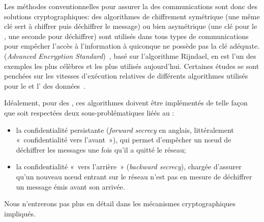 Les méthodes conventionnelles pour assurer la  des communications sont donc des solutions cryptographiques: des algorithmes de chiffrement symétrique (une même clé sert à chiffrer puis déchiffrer le message) ou bien asymétrique (une clé pour le , une seconde pour déchiffrer) sont utilisés dans tous types de communications pour empêcher l'accès à l'information à quiconque ne possède pas la clé adéquate.
 (\textit{Advanced Encryption Standard})~\cite{aes}, basé sur l'algorithme Rijndael, en est l'un des exemples les plus célèbres et les plus utilisés aujourd'hui.
Certaines études se sont penchées sur les vitesses d'exécution relatives de différents algorithmes utilisés pour le  et l' des données~\cite{SOBMCN11}.

Idéalement, pour des \rcs, ces algorithmes doivent être implémentés de telle façon que soit respectées deux sous-problématiques liéés au :
\begin{itemize}
    \item la confidentialité persistante (\textit{forward secrecy} en anglais, littéralement « confidentialité vers l'avant »), qui permet d'empêcher un nœud de déchiffrer les messages une fois qu'il a quitté le réseau;
    \item la confidentialité « vers l'arrière » (\textit{backward secrecy}), chargée d'assurer qu'un nouveau nœud entrant sur le réseau n'est pas en mesure de déchiffrer un message émis avant son arrivée.
\end{itemize}
Nous n'entrerons pas plus en détail dans les mécanismes cryptographiques impliqués.

